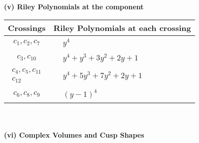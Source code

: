 \documentclass[1p]{elsarticle_modified}
\theoremstyle{definition}
\begin{document}
\newpage\renewcommand{\arraystretch}{1}
\flushleft \textbf{(v) Riley Polynomials at the component}\newline \\
\begin{tabular}{m{50pt}|m{274pt}}
Crossings & \hspace{64pt}Riley Polynomials at each crossing \\
\hline $$\begin{aligned}c_{1},c_{2},c_{7}\end{aligned}$$&$\begin{aligned}
&y^4
\end{aligned}$\\
\hline $$\begin{aligned}c_{3},c_{10}\end{aligned}$$&$\begin{aligned}
&y^4+y^3+3 y^2+2 y+1
\end{aligned}$\\
\hline $$\begin{aligned}c_{4},c_{5},c_{11}\\c_{12}\end{aligned}$$&$\begin{aligned}
&y^4+5 y^3+7 y^2+2 y+1
\end{aligned}$\\
\hline $$\begin{aligned}c_{6},c_{8},c_{9}\end{aligned}$$&$\begin{aligned}
&(y-1)^4
\end{aligned}$\\
\hline
\end{tabular}\\~\\
\newpage\flushleft \textbf{(vi) Complex Volumes and Cusp Shapes}
\end{document}
